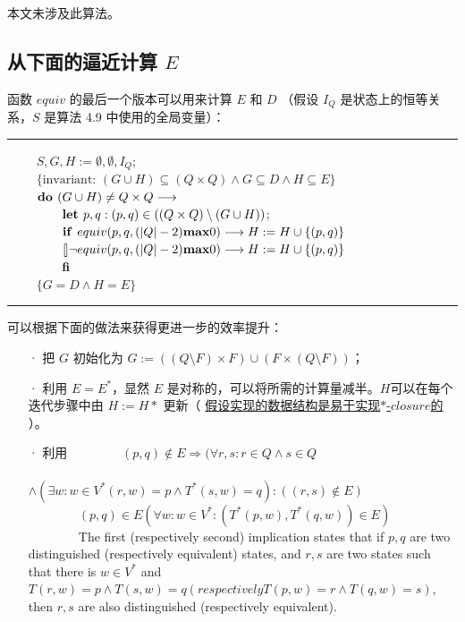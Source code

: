 本文未涉及此算法。


\subsection{从下面的逼近计算 $E$ }

函数 $equiv$ 的最后一个版本可以用来计算 $E$ 和 $D$ （假设 $I_Q $ 是状态上的恒等关系，$S$ 是算法 4.9 中使用的全局变量）：
\newline
{}
\\
\rule{\textwidth}{1pt}
\mbox{　　} $ S,G,H := \emptyset,\emptyset,I_Q$; \\
\mbox{　　} $ \{ \mbox{invariant: } (G \cup H ) \subseteq (Q \times Q) \land G \subseteq D \land H \subseteq E \} $ \\
\mbox{　　} $ \mbox{\textbf{do }} (G \cup H) \not= Q \times Q \longrightarrow  $ \\
\mbox{　　　　} $ \mbox{\textbf{let }} p,q : (p,q) \in ( ( Q\times Q) \setminus ( G \cup H) )  $; \\
\mbox{　　　　} $ \mbox{\textbf{if }} equiv ( p,q, (|Q|-2) \mbox{\textbf{max}} 0  ) \longrightarrow H:=H \cup \{ (p,q) \} $ \\
\mbox{　　　　} $ \talloblong \neg equiv ( p,q, (|Q|-2) \mbox{\textbf{max}} 0  ) \longrightarrow H:=H \cup \{ (p,q) \} $ \\
\mbox{　　　　} $ \mbox{\textbf{fi}}$ \\
\mbox{　　} $ \{ G=D \land H = E \} $ \\
\rule{\textwidth}{1pt}
可以根据下面的做法来获得更进一步的效率提升：
\begin{itemize}
    \item [·] 把 $G$ 初始化为 $ G := ( (Q\setminus F) \times F ) \cup ( F \times ( Q \setminus F ) ) $；
    \item [·] 利用 $E=E^*$，显然 $E$ 是对称的，可以将所需的计算量减半。$H$可以在每个迭代步骤中由 $H := H*$ 更新（ \underline{假设实现的数据结构是易于实现$*$-$closure$的} ）。
    \item [·] 利用 
    \newline
    \mbox{　　　　}$ (p,q) \notin E  \Rightarrow ( \forall r,s:r\in Q \land s \in Q $\\
    \mbox{　　　　　　　　}$\land (\exists w:w\in V^* (r,w) = p \land T^* (s,w) = q): ((r,s) \not\in E )$ \\
    \mbox{　　　　}$ (p,q) \in E (\forall w:w\in V^* : (T^*(p,w),T^*(q,w))\in E)$ \\
    \mbox{　　　　}The first (respectively second) implication states that if $p,q$ are two distinguished (respectively equivalent) states, and $r,s$ are two states such that there is $w \in V^*  $ and $ T(r,w) = p \land T(s,w) = q (respectively T(p,w) = r \land T (q,w) = s ) $, then $r,s$ are also distinguished (respectively equivalent).
\end{itemize}

